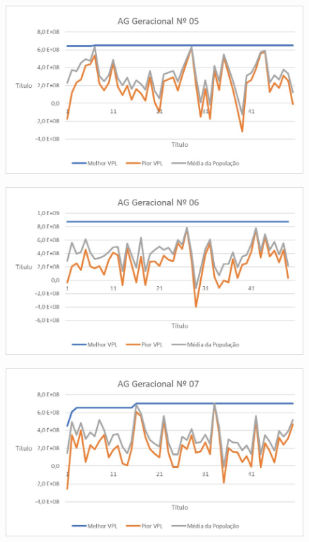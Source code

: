 \documentclass[12pt,a4paper]{report}
\begin{document}
\begin{figure}[H]
\centering

\includegraphics[scale=1]{ApB/AGG/5}

\end{figure}

\begin{figure}[H]
\centering

\includegraphics[scale=1]{ApB/AGG/6}

\end{figure}

\begin{figure}[H]
\centering

\includegraphics[scale=1]{ApB/AGG/7}

\end{figure}
\end{document}
